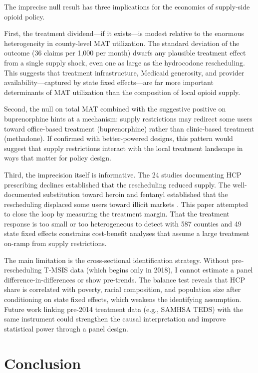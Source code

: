 \documentclass[12pt]{article}
\begin{document}
The imprecise null result has three implications for the economics of supply-side opioid policy.

First, the treatment dividend---if it exists---is modest relative to the enormous heterogeneity in county-level MAT utilization. The standard deviation of the outcome (36 claims per 1,000 per month) dwarfs any plausible treatment effect from a single supply shock, even one as large as the hydrocodone rescheduling. This suggests that treatment infrastructure, Medicaid generosity, and provider availability---captured by state fixed effects---are far more important determinants of MAT utilization than the composition of local opioid supply.

Second, the null on total MAT combined with the suggestive positive on buprenorphine hints at a mechanism: supply restrictions may redirect some users toward office-based treatment (buprenorphine) rather than clinic-based treatment (methadone). If confirmed with better-powered designs, this pattern would suggest that supply restrictions interact with the local treatment landscape in ways that matter for policy design.

Third, the imprecision itself is informative. The 24 studies documenting HCP prescribing declines established that the rescheduling reduced supply. The well-documented substitution toward heroin and fentanyl established that the rescheduling displaced some users toward illicit markets \citep{alpert2018supply, evans2019opioid}. This paper attempted to close the loop by measuring the treatment margin. That the treatment response is too small or too heterogeneous to detect with 587 counties and 49 state fixed effects constrains cost-benefit analyses that assume a large treatment on-ramp from supply restrictions.

The main limitation is the cross-sectional identification strategy. Without pre-rescheduling T-MSIS data (which begins only in 2018), I cannot estimate a panel difference-in-differences or show pre-trends. The balance test reveals that HCP share is correlated with poverty, racial composition, and population size after conditioning on state fixed effects, which weakens the identifying assumption. Future work linking pre-2014 treatment data (e.g., SAMHSA TEDS) with the same instrument could strengthen the causal interpretation and improve statistical power through a panel design.

\section{Conclusion}
\end{document}

